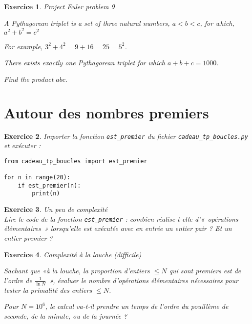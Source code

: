 \documentclass[a4paper,10pt]{article}
\newtheorem{exo}{\sc Exercice}
{\theorembodyfont{\rmfamily}\newtheorem{exo-f}{\sc Exercice}}
\renewcommand{\[}{[\![}
\renewcommand{\]}{]\!]}
\renewcommand{\leq}{\leqslant}
\renewcommand{\=}{\mathop{=}\limits}
\newcommand{\suite}[1]{\ensuremath{\left(#1_{n}\right)}}
\newcommand{\sys}[2]{
\left\lbrace
 \begin{array}{l}
  \negthickspace\negthickspace #1\\
  \negthickspace\negthickspace #2\\
 \end{array}
\right.\negthickspace\negthickspace}
\begin{document}

%


\begin{exo} \emph{Project  Euler problem 9}



A Pythagorean triplet is a set of three natural numbers, $a < b < c$, for which,
$a^2 + b^2 = c^2$

For example, $3^2 + 4^2 = 9 + 16 = 25 = 5^2$.

There exists exactly one Pythagorean triplet for which $a + b + c = 1000$.

Find the product $abc$.

\end{exo}




\section{Autour des nombres premiers}
\begin{exo}
  Importer la fonction \verb+est_premier+ du fichier
  \verb+cadeau_tp_boucles.py+ et exécuter :
\begin{verbatim}
from cadeau_tp_boucles import est_premier

for n in range(20):
    if est_premier(n):
        print(n)
\end{verbatim}
\end{exo}

\begin{exo} \emph{Un peu de complexité}\\
Lire le code de la fonction \verb+est_premier+ : combien
réalise-t-elle d'«~opérations élémentaires~» lorsqu'elle est exécutée
avec en entrée un entier pair ? Et un entier premier ?
\end{exo}


\begin{exo} \emph{Complexité à la louche (difficile)}

  Sachant que «à la louche, la proportion d'entiers $\leq N$ qui sont
  premiers est de l'ordre de $\frac{1}{\ln N}$~», évaluer le nombre
  d'opérations élémentaires 
  nécessaires pour tester la primalité des entiers $\leq N$.

  Pour $N=10^6$, le calcul va-t-il prendre un temps de l'ordre du
  pouillème de seconde, de la minute, ou de la journée ? 
\end{exo}
\end{document}
